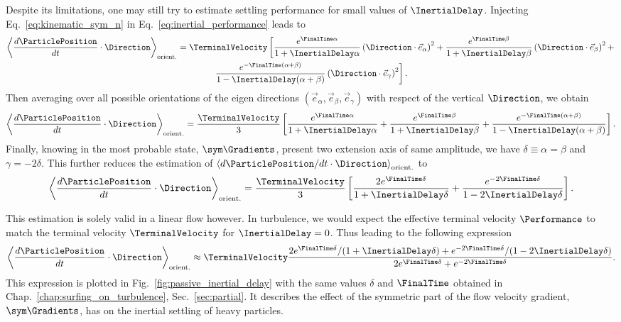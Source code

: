 Despite its limitations, one may still try to estimate settling performance for small values of $\InertialDelay$.
Injecting Eq.~\eqref{eq:kinematic_sym_n} in Eq.~\eqref{eq:inertial_performance} leads to
\begin{multline}
	\left\langle \frac{d \ParticlePosition}{dt} \cdot \Direction \right\rangle_{\mathrm{orient.}} = \TerminalVelocity \left[
		\frac{e^{\FinalTime \alpha}}{1 + \InertialDelay \alpha} \left( \Direction \cdot \vec{e}_\alpha \right)^2 +
		\frac{e^{\FinalTime \beta}}{1 + \InertialDelay \beta} \left( \Direction \cdot \vec{e}_\beta \right)^2 + \right. \\
		\left. \frac{e^{-\FinalTime (\alpha + \beta)}}{1 - \InertialDelay (\alpha + \beta)} \left( \Direction \cdot \vec{e}_\gamma \right)^2 
	 \right].
\end{multline}
Then averaging over all possible orientations of the eigen directions $(\vec{e}_\alpha, \vec{e}_\beta, \vec{e}_\gamma)$ with respect of the vertical $\Direction$, we obtain
\begin{equation}
	\left\langle \frac{d \ParticlePosition}{dt} \cdot \Direction \right\rangle_{\mathrm{orient.}} = \frac{\TerminalVelocity}{3} \left[
		\frac{e^{\FinalTime \alpha}}{1 + \InertialDelay \alpha} +
		\frac{e^{\FinalTime \beta}}{1 + \InertialDelay \beta} +
		\frac{e^{-\FinalTime (\alpha + \beta)}}{1 - \InertialDelay (\alpha + \beta)}
	 \right].
\end{equation}
Finally, knowing in the most probable state, $\sym \Gradients$, present two extension axis of same amplitude, we have $\delta \equiv \alpha = \beta$ and $\gamma = -2 \delta$.
This further reduces the estimation of $\left\langle d \ParticlePosition/dt \cdot \Direction \right\rangle_{\mathrm{orient.}}$ to
\begin{equation}
	\left\langle \frac{d \ParticlePosition}{dt} \cdot \Direction \right\rangle_{\mathrm{orient.}} = \frac{\TerminalVelocity}{3} \left[
		\frac{2 e^{\FinalTime \delta}}{1 + \InertialDelay \delta} +
		\frac{e^{-2 \FinalTime \delta}}{1 - 2 \InertialDelay \delta}
	 \right].
\end{equation}

This estimation is solely valid in a linear flow however.
In turbulence, we would expect the effective terminal velocity $\Performance$ to match the terminal velocity $\TerminalVelocity$ for $\InertialDelay = 0$.
Thus leading to the following expression
\begin{equation}
	\left\langle \frac{d \ParticlePosition}{dt} \cdot \Direction \right\rangle_{\mathrm{orient.}} \approx \TerminalVelocity \frac{2 e^{\FinalTime \delta}/(1 + \InertialDelay \delta) +
		e^{-2 \FinalTime \delta}/(1 - 2 \InertialDelay \delta)}{2 e^{\FinalTime \delta} + e^{-2 \FinalTime \delta}}.
\end{equation}
This expression is plotted in Fig.~\ref{fig:passive_inertial_delay} with the same values $\delta$ and $\FinalTime$ obtained in Chap.~\ref{chap:surfing_on_turbulence}, Sec.~\ref{sec:partial}.
It describes the effect of the symmetric part of the flow velocity gradient, $\sym \Gradients$, has on the inertial settling of heavy particles.

